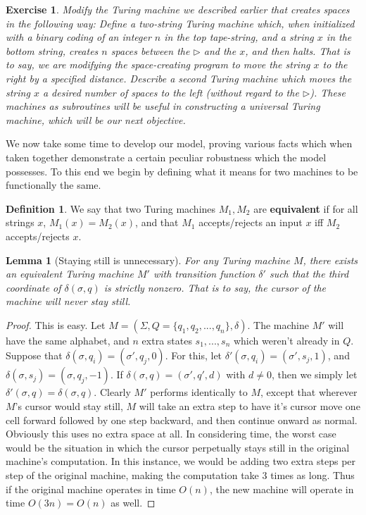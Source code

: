 \documentclass{article}
\theoremstyle{definition}
\newtheorem{definition}{Definition}[section]
\theoremstyle{plain}
\newtheorem{exercise}{Exercise}[section]
\theoremstyle{theorem}
\newtheorem{lemma}{Lemma}[section]
\begin{document}
\begin{exercise}
	Modify the Turing machine we described earlier that creates spaces in the following way: Define a two-string Turing machine which, when initialized with a binary coding of an integer $n$ in the top tape-string, and a string $x$ in the bottom string, creates $n$ spaces between the $\triangleright$ and the $x$, and then halts. That is to say, we are modifying the space-creating program to move the string $x$ to the right by a specified distance. Describe a second Turing machine which moves the string $x$ a desired number of spaces to the left (without regard to the $\triangleright$). These machines as subroutines will be useful in constructing a universal Turing machine, which will be our next objective. 
\end{exercise}
We now take some time to develop our model, proving various facts which when taken together demonstrate a certain peculiar robustness which the model possesses. To this end we begin by defining what it means for two machines to be functionally the same.
\begin{definition}
	We say that two Turing machines $M_1,M_2$ are \textbf{equivalent} if for all strings $x$, $M_1(x) = M_2(x)$, and that $M_1$ accepts/rejects an input $x$ iff $M_2$ accepts/rejects $x$. 
\end{definition} 
\begin{lemma}[Staying still is unnecessary]
	For any Turing machine $M$, there exists an equivalent Turing machine $M'$ with transition function $\delta'$ such that the third coordinate of $\delta(\sigma,q)$ is strictly nonzero. That is to say, the cursor of the machine will never stay still.
\end{lemma}
\begin{proof}
	This is easy. Let $M = (\Sigma,Q = \{q_1,q_2,...,q_n\},\delta)$. The machine $M'$ will have the same alphabet, and $n$ extra states $s_1,...,s_n$ which weren't already in $Q$. Suppose that $\delta(\sigma,q_i) = (\sigma',q_j,0)$. For this, let $\delta'(\sigma,q_i) = (\sigma',s_j,1)$, and $\delta(\sigma,s_j) = (\sigma,q_j,-1)$. If $\delta(\sigma,q) = (\sigma',q',d)$ with $d \neq 0$, then we simply let $\delta'(\sigma,q) = \delta(\sigma,q)$. Clearly $M'$ performs identically to $M$, except that wherever $M$'s cursor would stay still, $M$ will take an extra step to have it's cursor move one cell forward followed by one step backward, and then continue onward as normal. Obviously this uses no extra space at all. In considering time, the worst case would be the situation in which the cursor perpetually stays still in the original machine's computation. In this instance, we would be adding two extra steps per step of the original machine, making the computation take $3$ times as long. Thus if the original machine operates in time $O(n)$, the new machine will operate in time $O(3n) = O(n)$ as well. 
\end{proof}
\end{document}
